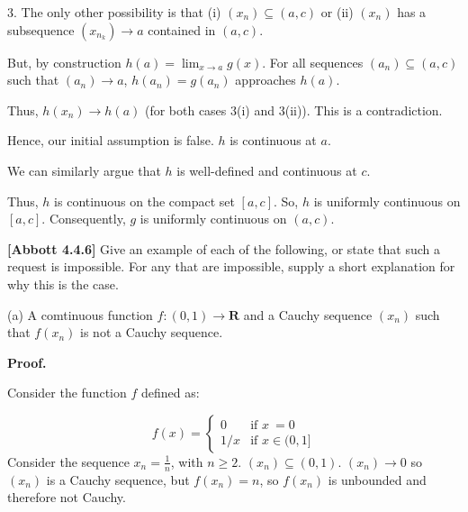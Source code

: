 \documentclass[10pt]{article}
\begin{document}
3. The only other possibility is that (i) $\displaystyle ( x_{n}) \subseteq ( a,c)$ or (ii) $\displaystyle ( x_{n})$ has a subsequence $\displaystyle ( x_{n_{k}})\rightarrow a$ contained in $\displaystyle ( a,c)$. 



But, by construction $\displaystyle h( a) =\lim _{x\rightarrow a} g( x)$. For all sequences $\displaystyle ( a_{n}) \subseteq ( a,c)$ such that $\displaystyle ( a_{n})\rightarrow a$, $\displaystyle h( a_{n}) =g( a_{n})$ approaches $\displaystyle h( a)$. \ 



Thus, $\displaystyle h( x_{n})\rightarrow h( a)$ (for both cases 3(i) and 3(ii)). This is a contradiction.



Hence, our initial assumption is false. $\displaystyle h$ is continuous at $\displaystyle a$. 



We can similarly argue that $\displaystyle h$ is well-defined and continuous at $\displaystyle c$. 



Thus, $\displaystyle h$ is continuous on the compact set $\displaystyle [ a,c]$. So, $\displaystyle h$ is uniformly continuous on $\displaystyle [ a,c]$. Consequently, $\displaystyle g$ is uniformly continuous on $\displaystyle ( a,c)$.



\textbf{[Abbott 4.4.6]} Give an example of each of the following, or state that such a request is impossible. For any that are impossible, supply a short explanation for why this is the case.



(a) A comtinuous function $\displaystyle f:( 0,1)\rightarrow \mathbf{R}$ and a Cauchy sequence $\displaystyle ( x_{n})$ such that $\displaystyle f( x_{n})$ is not a Cauchy sequence.



\textbf{Proof.}



Consider the function $\displaystyle f$ defined as:


\begin{equation*}
f( x) =\begin{cases}
0 & \text{if } x\ =0\\
1/x & \text{if } x\in ( 0,1]
\end{cases}
\end{equation*}
Consider the sequence $\displaystyle x_{n} =\frac{1}{n}$, with $\displaystyle n\geq 2$. $\displaystyle ( x_{n}) \subseteq ( 0,1)$. $\displaystyle ( x_{n})\rightarrow 0$ so $\displaystyle ( x_{n})$ is a Cauchy sequence, but $\displaystyle f( x_{n}) =n$, so $\displaystyle f( x_{n})$ is unbounded and therefore not Cauchy.
\end{document}

